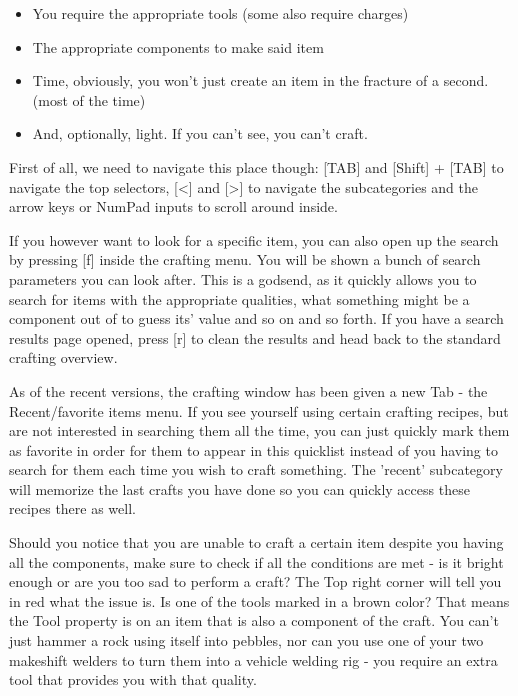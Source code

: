\begin{itemize}
\item You require the appropriate tools (some also require charges)
\item The appropriate components to make said item
\item Time, obviously, you won't just create an item in the fracture of a second. (most of the time)
\item And, optionally, light. If you can't see, you can't craft.
\end{itemize}

First of all, we need to navigate this place though: [TAB] and [Shift] + [TAB] to navigate the top selectors, [<] and [>] to navigate the subcategories and the arrow keys or NumPad inputs to scroll around inside.

If you however want to look for a specific item, you can also open up the search by pressing [f] inside the crafting menu. You will be shown a bunch of search parameters you can look after. This is a godsend, as it quickly allows you to search for items with the appropriate qualities, what something might be a component out of to guess its' value and so on and so forth. If you have a search results page opened, press [r] to clean the results and head back to the standard crafting overview.

As of the recent versions, the crafting window has been given a new Tab - the Recent/favorite items menu. If you see yourself using certain crafting recipes, but are not interested in searching them all the time, you can just quickly mark them as favorite in order for them to appear in this quicklist instead of you having to search for them each time you wish to craft something. The 'recent' subcategory will memorize the last crafts you have done so you can quickly access these recipes there as well.

Should you notice that you are unable to craft a certain item despite you having all the components, make sure to check if all the conditions are met - is it bright enough or are you too sad to perform a craft? The Top right corner will tell you in red what the issue is. Is one of the tools marked in a brown color? That means the Tool property is on an item that is also a component of the craft. You can't just hammer a rock using itself into pebbles, nor can you use one of your two makeshift welders to turn them into a vehicle welding rig - you require an extra tool that provides you with that quality.

